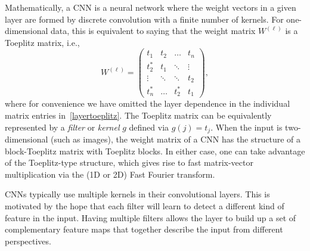 Mathematically, a CNN is a neural network where the weight vectors in a given layer are formed by discrete convolution
with a finite number of kernels. For one-dimensional data, this is equivalent to saying that the weight
matrix $W^{(\ell)}$ is a Toeplitz matrix, i.e., 
\begin{equation}\label{layertoeplitz}
  W^{(\ell)} = 
  \begin{pmatrix}
    t_1       & t_2       & \ldots & t_{n}\\
    t_2^{\ast}  & t_1       & \ddots & \vdots\\
    \vdots & \ddots & \ddots  & t_2\\
    t_{n}^{\ast}      & \ldots & t_2^{\ast}   &  t_1
  \end{pmatrix},
\end{equation}
where for convenience we have omitted the layer dependence in the individual matrix entries in~\eqref{layertoeplitz}.
The Toeplitz matrix can be equivalently represented by a {\em filter} or {\em kernel} $g$ defined via $g(j) = t_j$. 
When the input is two-dimensional (such as images), the weight matrix of a CNN has the structure of a block-Toeplitz matrix with Toeplitz blocks. In either case, one can take advantage of the Toeplitz-type structure, which gives rise to fast matrix-vector multiplication via the (1D or 2D) Fast Fourier transform.

CNNs typically use multiple kernels in their convolutional layers. This is motivated by the hope  that each filter will learn to detect a different kind of feature in the input. Having multiple filters allows the layer to build up a set of complementary feature maps that together describe the input from different perspectives.






